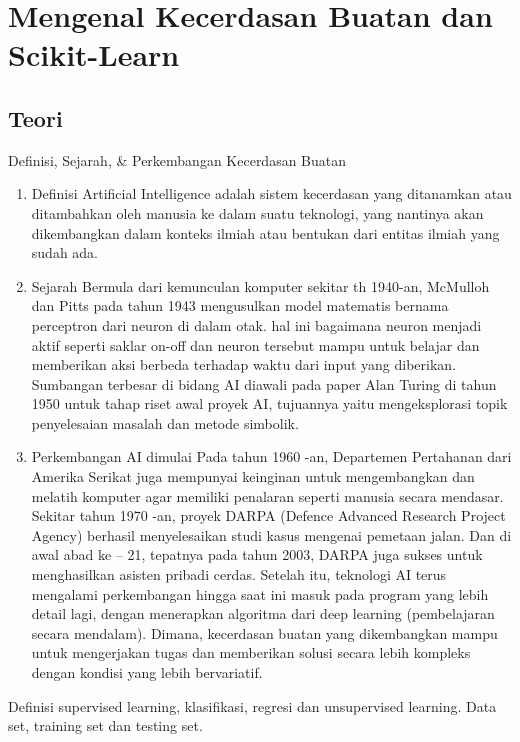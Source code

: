 \chapter{Mengenal Kecerdasan Buatan dan Scikit-Learn}
\section{Teori}
Definisi, Sejarah, \& Perkembangan Kecerdasan Buatan
\begin{enumerate}
    \item Definisi
    Artificial Intelligence adalah sistem kecerdasan yang ditanamkan atau ditambahkan oleh manusia ke dalam suatu teknologi, yang nantinya akan dikembangkan dalam konteks ilmiah atau bentukan dari entitas ilmiah yang sudah ada.
    \item Sejarah
    Bermula dari kemunculan komputer sekitar th 1940-an, McMulloh dan Pitts pada tahun 1943 mengusulkan model matematis bernama perceptron dari neuron di dalam  otak. hal ini bagaimana neuron menjadi aktif seperti saklar on-off dan neuron tersebut mampu untuk belajar dan memberikan aksi berbeda terhadap waktu dari input yang diberikan.\\ 
    Sumbangan terbesar di bidang AI diawali pada paper Alan Turing di tahun 1950 untuk tahap riset awal proyek AI, tujuannya yaitu mengeksplorasi topik penyelesaian masalah dan metode simbolik.
    \item Perkembangan AI dimulai Pada tahun 1960 -an, Departemen Pertahanan dari Amerika Serikat juga mempunyai keinginan untuk mengembangkan dan melatih komputer agar memiliki penalaran seperti manusia secara mendasar. Sekitar tahun 1970 -an, proyek DARPA (Defence Advanced Research Project Agency) berhasil menyelesaikan studi kasus mengenai pemetaan jalan. Dan di awal abad ke – 21, tepatnya pada tahun 2003, DARPA juga sukses untuk menghasilkan asisten pribadi cerdas. Setelah itu, teknologi AI terus mengalami perkembangan hingga saat ini masuk pada program yang lebih detail lagi, dengan menerapkan algoritma dari deep learning (pembelajaran secara mendalam). Dimana, kecerdasan buatan yang dikembangkan mampu untuk mengerjakan tugas dan memberikan solusi secara lebih kompleks dengan kondisi yang lebih bervariatif.
\end{enumerate}
Definisi supervised learning, klasiﬁkasi, regresi dan unsupervised learning. Data set, training set dan testing set.
